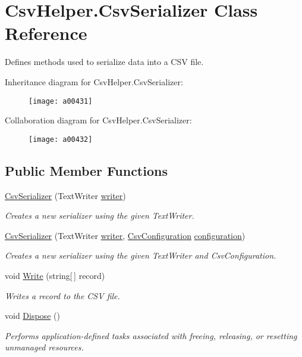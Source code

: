 \hypertarget{a00073}{\section{Csv\-Helper.\-Csv\-Serializer Class Reference}
\label{a00073}
}


Defines methods used to serialize data into a C\-S\-V file.  




Inheritance diagram for Csv\-Helper.\-Csv\-Serializer\-:
\nopagebreak
\begin{figure}[H]
\begin{center}
\leavevmode
\texttt{[image: a00431]}
\end{center}
\end{figure}


Collaboration diagram for Csv\-Helper.\-Csv\-Serializer\-:
\nopagebreak
\begin{figure}[H]
\begin{center}
\leavevmode
\texttt{[image: a00432]}
\end{center}
\end{figure}
\subsection*{Public Member Functions}
\begin{DoxyCompactItemize}
\item 
\hyperlink{a00073_a74ea10f7aaea0a478087d8ff6182f38c}{Csv\-Serializer} (Text\-Writer \hyperlink{a00073_adfb235fa2c868fc79c0376fd12fda767}{writer})
\begin{DoxyCompactList}\small\item\em Creates a new serializer using the given Text\-Writer. \end{DoxyCompactList}\item 
\hyperlink{a00073_ab14fe4a4f630ce97d57c27e2ee050fac}{Csv\-Serializer} (Text\-Writer \hyperlink{a00073_adfb235fa2c868fc79c0376fd12fda767}{writer}, \hyperlink{a00057}{Csv\-Configuration} \hyperlink{a00073_ae8c56ff97c0a797245f2205c486833ea}{configuration})
\begin{DoxyCompactList}\small\item\em Creates a new serializer using the given Text\-Writer and Csv\-Configuration. \end{DoxyCompactList}\item 
void \hyperlink{a00073_aefad906acd048863d3dd414651a44793}{Write} (string\mbox{[}$\,$\mbox{]} record)
\begin{DoxyCompactList}\small\item\em Writes a record to the C\-S\-V file. \end{DoxyCompactList}\item 
void \hyperlink{a00073_a9d0e8b3508b377a7f978da2394b09e36}{Dispose} ()
\begin{DoxyCompactList}\small\item\em Performs application-\/defined tasks associated with freeing, releasing, or resetting unmanaged resources. \end{DoxyCompactList}\end{DoxyCompactItemize}
